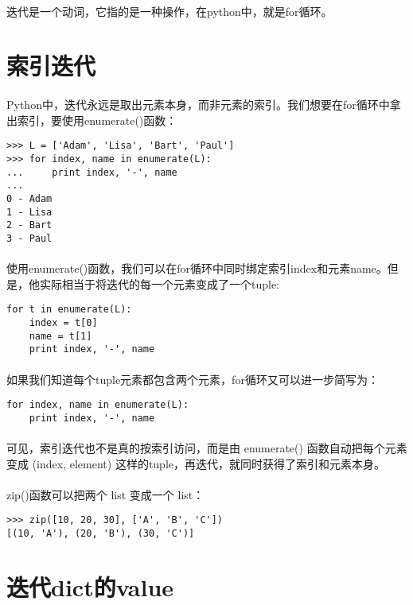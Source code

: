 \documentclass{article}
\begin{document}
\begin{CJK}{UTF8}{gbsn}
\paragraph{}
迭代是一个动词，它指的是一种操作，在python中，就是for循环。
\section{索引迭代}
\paragraph{}
Python中，迭代永远是取出元素本身，而非元素的索引。我们想要在for循环中拿出索引，要使用enumerate()函数：
\begin{verbatim}
>>> L = ['Adam', 'Lisa', 'Bart', 'Paul']
>>> for index, name in enumerate(L):
...     print index, '-', name
... 
0 - Adam
1 - Lisa
2 - Bart
3 - Paul
\end{verbatim}
\paragraph{}
使用enumerate()函数，我们可以在for循环中同时绑定索引index和元素name。但是，他实际相当于将迭代的每一个元素变成了一个tuple:
\begin{verbatim}
for t in enumerate(L):
    index = t[0]
    name = t[1]
    print index, '-', name
\end{verbatim}
\paragraph{}
如果我们知道每个tuple元素都包含两个元素，for循环又可以进一步简写为：
\begin{verbatim}
for index, name in enumerate(L):
    print index, '-', name
\end{verbatim}
\paragraph{}
可见，索引迭代也不是真的按索引访问，而是由 enumerate() 函数自动把每个元素变成 (index, element) 这样的tuple，再迭代，就同时获得了索引和元素本身。
\paragraph{}
zip()函数可以把两个 list 变成一个 list：
\begin{verbatim}
>>> zip([10, 20, 30], ['A', 'B', 'C'])
[(10, 'A'), (20, 'B'), (30, 'C')]
\end{verbatim}
\section{迭代dict的value}

\end{CJK}
\end{document}
